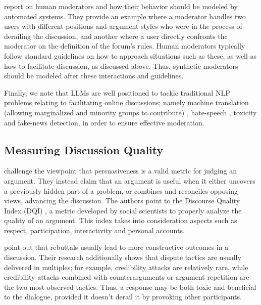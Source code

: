 \citet{vecchi-2021-towards} report on human moderators and how their behavior should be modeled by automated systems. They provide an example where a moderator handles two users with different positions and argument styles who were in the process of derailing the discussion, and another where a user directly confronts the moderator on the definition of the forum's rules. Human moderators typically follow standard guidelines on how to approach situations such as these, as well as how to facilitate discussion, as discussed above. Thus, synthetic moderators should be modeled after these interactions and guidelines.

Finally, we note that LLMs are well positioned to tackle traditional \ac{NLP} problems relating to facilitating online discussions; namely machine translation (allowing marginalized and minority groups to contribute) \cite{Tsai2024Generative}, hate-speech \cite{Nirmal2024TowardsIH, shi-2024-hatespeech}, toxicity \cite{kang-qian-2024-implanting, Wang2022ToxicityDW} and fake-news \cite{Liu2024DetectIJ, Xu2024ACS} detection, in order to ensure effective moderation. 


\subsection{Measuring Discussion Quality}
\label{sec:related:measures}

\citet{vecchi-2021-towards} challenge the viewpoint that persuasiveness is a valid metric for judging an argument. They instead claim that an argument is useful when it either uncovers a previously hidden part of a problem, or combines and reconciles opposing views, advancing the discussion. The authors point to the Discourse Quality Index (DQI) \cite{Steiner2005-STEDPI-8, stab-gurevych-2017-parsing}, a metric developed by social scientists to properly analyze the quality of an argument. This index takes into consideration aspects such as respect, participation, interactivity and personal accounts.

\citet{dekock2022disagree} point out that rebuttals usually lead to more constructive outcomes in a discussion. Their research additionally shows that dispute tactics are usually delivered in multiples; for example, credibility attacks are relatively rare, while credibility attacks combined with counterarguments or argument repetition are the two most observed tactics. Thus, a response may be both toxic and beneficial to the dialogue, provided it doesn't derail it by provoking other participants.

